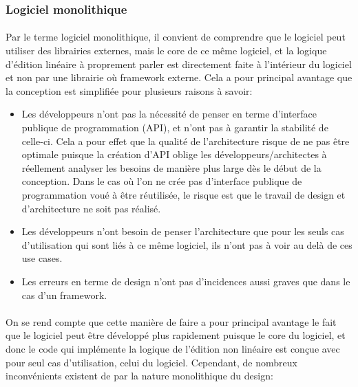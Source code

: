 \subsubsection{Logiciel monolithique} %

\paragraph{} Par le terme logiciel monolithique, il convient de
comprendre que le logiciel peut utiliser des librairies externes, mais
le core de ce même logiciel, et la logique d'édition linéaire à
proprement parler est directement faite à l'intérieur du logiciel et
non par une librairie où framework externe. Cela a pour principal avantage
que la conception est simplifiée pour plusieurs raisons à savoir:

\begin{itemize}
  \item {Les développeurs n'ont pas la nécessité de penser
    en terme d'interface publique de programmation (API),
    et n'ont pas à garantir la stabilité de celle-ci. Cela
    a pour effet que la qualité de l'architecture
    risque de ne pas être optimale puisque la création d'API oblige
    les développeurs/architectes à réellement analyser les besoins
    de manière plus large dès le début de la conception. Dans le cas
    où l'on ne crée pas d'interface publique de programmation voué à
    être réutilisée, le risque est que le travail de design et
    d'architecture ne soit pas réalisé.}
  \item {Les développeurs n'ont besoin de penser l'architecture que pour
    les seuls cas d'utilisation qui sont liés à ce même logiciel, %
    ils n'ont pas à voir au delà de ces use cases.}
  \item {Les erreurs en terme de design n'ont pas d'incidences aussi graves
    que dans le cas d'un framework.}
\end {itemize}

\paragraph{} On se rend compte que cette manière de faire a pour
principal avantage le fait que le logiciel peut être développé plus
rapidement puisque le core du logiciel, et donc le code qui implémente
la logique de l'édition non linéaire est conçue avec pour seul cas
d'utilisation, celui du logiciel. Cependant, de
nombreux inconvénients existent de par la nature monolithique du design:

